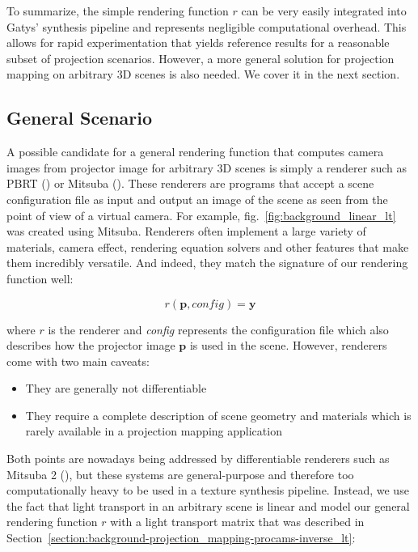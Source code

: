 To summarize, the simple rendering function \(r\) can be very easily integrated into Gatys' synthesis pipeline and represents negligible computational overhead. This allows for rapid experimentation that yields reference results for a reasonable subset of projection scenarios. However, a more general solution for projection mapping on arbitrary 3D scenes is also needed. We cover it in the next section.

\subsection{General Scenario}
\label{section:methods-rendering_function-general}

A possible candidate for a general rendering function that computes camera images from projector image for arbitrary 3D scenes is simply a renderer such as PBRT (\citet{PBRT3e}) or Mitsuba (\citet{Mitsuba}). These renderers are programs that accept a scene configuration file as input and output an image of the scene as seen from the point of view of a virtual camera. For example, fig.~\ref{fig:background_linear_lt} was created using Mitsuba. Renderers often implement a large variety of materials, camera effect, rendering equation solvers and other features that make them incredibly versatile. And indeed, they match the signature of our rendering function well:

\begin{equation}
    \label{eq:rendering_function-renderer}
    r(\bm{p}, \textit{config}) = \bm{y}
\end{equation}

where \(r\) is the renderer and \textit{config} represents the configuration file which also describes how the projector image \(\bm{p}\) is used in the scene. However, renderers come with two main caveats:

\begin{itemize}
    \item They are generally not differentiable
    \item They require a complete description of scene geometry and materials which is rarely available in a projection mapping application
\end{itemize}

Both points are nowadays being addressed by differentiable renderers such as Mitsuba 2 (\citet{Mitsuba2}), but these systems are general-purpose and therefore too computationally heavy to be used in a texture synthesis pipeline. Instead, we use the fact that light transport in an arbitrary scene is linear and model our general rendering function \(r\) with a light transport matrix that was described in Section~\ref{section:background-projection_mapping-procams-inverse_lt}:

